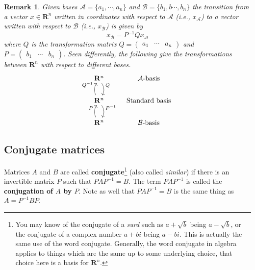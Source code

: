 \documentclass[12pt]{article}
\numberwithin{equation}{subsection}
\numberwithin{figure}{subsection}
\theoremstyle{note}
\newtheorem{remark}[subsection]{Remark}
\newcommand{\R}{\mathbf{R}}
\begin{document}
\begin{remark}Given bases $\mathcal{A}=\{a_1,\cdots,a_n\}$ and $\mathcal{B}=\{b_1,b\cdots,b_n\}$ the transition from a vector $x\in\mathbf{R}^n$ written in coordinates with respect to $\mathcal{A}$ (i.e., $x_{\mathcal{A}}$) to a vector written with respect to $\mathcal{B}$ (i.e., $x_{\mathcal{B}}$) is given by \begin{equation} \label{eq-change-basis} x_{\mathcal{B}}=P^{-1}Qx_{\mathcal{A}}\end{equation} where $Q$ is the transformation matrix $Q=\begin{pmatrix} a_1 & \cdots & a_n\end{pmatrix}$ and $P=\begin{pmatrix} b_1 & \cdots & b_n\end{pmatrix}$. Seen differently, the following give the transformations between $\R^n$ with respect to different bases. 
\begin{equation}
 \begin{tikzcd} \R^n \arrow[bend left]{d}{Q} & \text{$\mathcal{A}$-basis} \\ 
 \R^n \arrow[bend left]{d}{P^{-1}} \arrow[bend left]{u}{Q^{-1}} & \text{Standard basis} \\  
 \R^n  \arrow[bend left]{u}{P} & \text{$\mathcal{B}$-basis} 
 \end{tikzcd} \end{equation}
\end{remark}

\subsection{Conjugate matrices}

Matrices $A$ and $B$ are called \textbf{conjugate}\footnote{You may know of the conjugate of a \textit{surd} such as $a+\sqrt{b}$ being $a-\sqrt{b}$, or the conjugate of a complex number $a+bi$ being $a-bi$. This is actually the same use of the word conjugate. Generally, the word conjugate in algebra applies to things which are the same up to some underlying choice, that choice here is a basis for $\R^n$. } (also called \textit{similar}) if there is an invertible matrix $P$ such that $PAP^{-1}=B$. The term $PAP^{-1}$ is called the \textbf{conjugation of $A$ by $P$}. Note as well that $PAP^{-1}=B$ is the same thing as $A=P^{-1}BP$.
\end{document}
